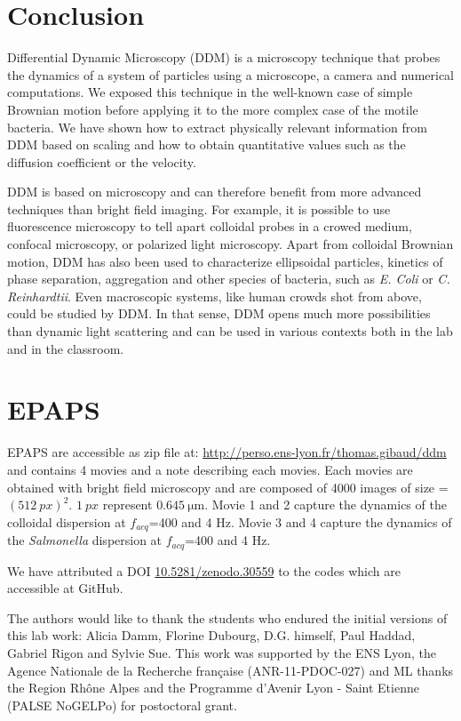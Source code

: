 \documentclass[prb,twocolumn,amsmath,amssymb]{revtex4-1}
\begin{document}
\section{Conclusion}
\label{sec:cl}
Differential Dynamic Microscopy (DDM) is a microscopy technique that probes the dynamics of a system of particles using a microscope, a camera and numerical computations. We exposed this technique in the well-known case of simple Brownian motion before applying it to the more complex case of the motile bacteria. We have shown how to extract physically relevant information from DDM based on scaling and how to obtain quantitative values such as the diffusion coefficient or the velocity.

DDM is based  on microscopy and can therefore benefit from  more advanced techniques than bright field imaging. For example, it is possible to use fluorescence microscopy to tell apart colloidal probes in a crowed medium\cite{Hendricks2015}, confocal microscopy\cite{Lu2012}, or polarized light microscopy\citep{20_reufer2012differential}. Apart from colloidal Brownian motion, DDM has also been used to characterize ellipsoidal particles\citep{20_reufer2012differential}, kinetics of phase separation\cite{Gao2015}, aggregation\cite{Ferri2011} and other species of bacteria, such as \textit{E. Coli} or \textit{C. Reinhardtii}\cite{4_Martinez20121637}. Even macroscopic systems, like human crowds shot from above, could be studied by DDM. In that sense, DDM opens much more possibilities than dynamic light scattering and can be used in various contexts both in the lab and in the classroom.

\section*{EPAPS}
\label{sec:epaps}
EPAPS are accessible as zip file at: \url{http://perso.ens-lyon.fr/thomas.gibaud/ddm} and  contains 4 movies and a note describing each movies. Each movies are obtained with bright field microscopy and are composed of 4000 images of size = $(\SI{512}{px})^2$.  $\SI{1}{px}$ represent $\SI{0.645}{\micro\meter}$. Movie 1 and 2 capture the dynamics of the colloidal dispersion at $f_{acq}$=400 and 4 Hz. Movie 3 and 4 capture the dynamics of the \textit{Salmonella} dispersion at $f_{acq}$=400 and 4 Hz.

We have attributed a DOI \href{http://dx.doi.org/10.5281/zenodo.30559}{10.5281/zenodo.30559}\cite{code_github} to the codes which are accessible at GitHub.


\begin{acknowledgments}
The authors would like to thank the students who endured the initial versions of this lab work: Alicia Damm, Florine Dubourg, D.G. himself, Paul Haddad, Gabriel Rigon and Sylvie Sue. 
This work was supported by the ENS Lyon, the Agence Nationale de la Recherche fran\c{c}aise (ANR-11-PDOC-027) and ML thanks the Region Rh\^one Alpes and
the Programme d'Avenir Lyon - Saint Etienne (PALSE NoGELPo) for postoctoral grant.
\end{acknowledgments}



\end{document}
